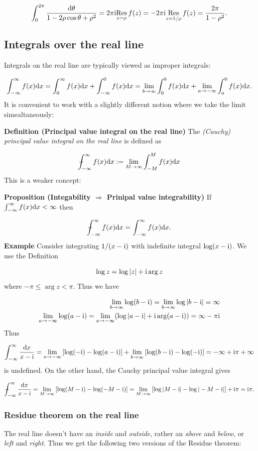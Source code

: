 \documentclass[12pt,a4paper]{article}
\def\D{ {\rm d} }
\def\I{ {\rm i} }
\def\Res_#1{\underset{#1}{\rm Res}\,}
\def\Xint#1{ \mathchoice
   {\XXint\displaystyle\textstyle{#1} }%
   {\XXint\textstyle\scriptstyle{#1} }%
   {\XXint\scriptstyle\scriptscriptstyle{#1} }%
   {\XXint\scriptscriptstyle\scriptscriptstyle{#1} }%
   \!\int}
\def\XXint#1#2#3{ {\setbox0=\hbox{$#1{#2#3}{\int}$}
     \vcenter{\hbox{$#2#3$}}\kern-.5\wd0} }
\def\dashint{\Xint-}
\def\infdashint{\dashint_{-\infty}^\infty}
\def\dx{\D x}
\def\br[#1]{\left[{#1}\right]}
\begin{document}
\[
\int_0^{2\pi} {\D \theta \over 1 - 2\rho \cos \theta + \rho^2} = 2 \pi \I \Res_{z = \rho} f(z) = 
-2 \pi \I \Res_{z = 1/\rho} f(z) = {2 \pi \over 1 - \rho^2}.
\]
\subsection{Integrals over the real line}
Integrals on the real line are typically viewed as improper integrals:

\[
\int_{-\infty}^\infty f(x) \dx = \int_0^\infty f(x) \dx +\int_{-\infty}^0 f(x)\dx = 
\lim_{b \rightarrow \infty} \int_0^b f(x) \dx + \lim_{a \rightarrow -\infty} \int_a^0 f(x) \dx.
\]
It is convenient to work with a slightly different notion where we take the limit simealtaneously:

\textbf{Definition (Principal value integral on the real line)} The \emph{(Cauchy) principal value integral on the real line} is defined as

\[
\infdashint f(x) \dx := \lim_{M\rightarrow \infty} \int_{-M}^M f(x) \dx
\]
This is a weaker concept:

\textbf{Proposition (Integability $\Rightarrow$ Prinipal value integrability)} If  $\int_{-\infty}^\infty f(x) \dx < \infty$ then 

\[
\infdashint f(x) \dx = \int_{-\infty}^\infty f(x) \dx.
\]
\textbf{Example} Consider integrating $1/(x-\I)$ with indefinite integral $\log(x-\I)$. We use the Definition

\[
\log z = \log |z| + \I \arg z
\]
where $- \pi \leq \arg z < \pi$. Thus we have


\begin{align*}
\lim_{b \rightarrow \infty} \log(b - \I) = \lim_{b \rightarrow \infty} \log|b - \I| = \infty \\
\lim_{a \rightarrow -\infty} \log(a - \I) = \lim_{a \rightarrow -\infty} (\log|a - \I| + \I \arg(a-\I)) = \infty - \pi \I 
\end{align*}
Thus

\[
\int_{-\infty}^\infty {\dx \over x - \I} = \lim_{a \rightarrow -\infty} \br[\log(-\I) - \log(a-\I)] + 
\lim_{b \rightarrow \infty} \br[\log(b-\I) - \log(-\I)] =  -\infty + \I \pi + \infty
\]
is undefined. On the other hand, the Cauchy principal value integral gives

\[
\infdashint {\dx \over x - \I} = \lim_{M \rightarrow \infty} \br[\log(M-\I) - \log(-M - \I)] =
 \lim_{M \rightarrow \infty} \br[\log|M-\I| - \log|-M - \I|]  + \I \pi = \I \pi.
\]
\subsubsection{Residue theorem on the real line}
The real line doesn't have an \emph{inside} and \emph{outside}, rather an \emph{above} and \emph{below}, or \emph{left} and \emph{right}. Thus we get the following two versions of the Residue theorem:
\end{document}
